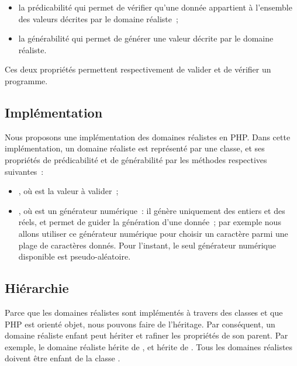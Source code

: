 \begin{itemize}

\item la {\strong prédicabilité} qui permet de vérifier qu'une donnée appartient
à l'ensemble des valeurs décrites par le domaine réaliste~;

\item la {\strong générabilité} qui permet de générer une valeur décrite par le
domaine réaliste.

\end{itemize}

Ces deux propriétés permettent respectivement de {\strong valider} et de
{\strong vérifier} un programme.

\subsection{Implémentation}
\label{subsection:language:realdom:implementation}

Nous proposons une implémentation des domaines réalistes en PHP. Dans cette
implémentation, un domaine réaliste est représenté par une {\strong classe}, et
ses propriétés de prédicabilité et de générabilité par les {\strong méthodes}
respectives suivantes~:

\begin{itemize}

\item {}, où  est la valeur à valider~;

\item {}, où  est un {\strong générateur
numérique}~: il génère uniquement des entiers et des réels, et permet de guider
la génération d'une donnée~; par exemple nous allons utiliser ce générateur
numérique pour choisir un caractère parmi une plage de caractères donnés.  Pour
l'instant, le seul générateur numérique disponible est pseudo-aléatoire.

\end{itemize}

\subsection{Hiérarchie}
\label{subsection:language:realdom:hierarchy}

Parce que les domaines réalistes sont implémentés à travers des classes et que
PHP est orienté objet, nous pouvons faire de l'{\strong héritage}. Par
conséquent, un domaine réaliste enfant peut hériter et {\strong rafiner} les
propriétés de son parent. Par exemple, le domaine réaliste  hérite
de , et  hérite de . Tous les
domaines réalistes doivent être enfant de la classe .

